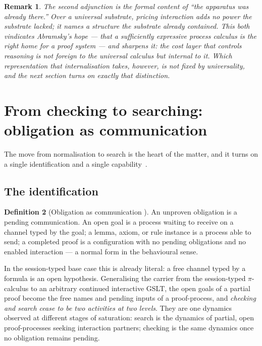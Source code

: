 \documentclass[11pt]{article}
\theoremstyle{definition}
\newtheorem{definition}{Definition}[section]
\theoremstyle{plain}
\newtheorem{remark}[definition]{Remark}
\begin{document}
\begin{remark}
The second adjunction is the formal content of ``the apparatus was already
there.'' Over a universal substrate, pricing interaction adds no power the
substrate lacked; it names a structure the substrate already contained. This
both vindicates Abramsky's hope --- that a sufficiently expressive process
calculus is the right home for a proof system --- and sharpens it: the cost
layer that controls reasoning is not foreign to the universal calculus but
internal to it. Which representation that internalisation takes, however, is not
fixed by universality, and the next section turns on exactly that distinction.
\end{remark}

\section{From checking to searching: obligation as communication}\label{sec:search}

The move from normalisation to search is the heart of the matter, and it turns
on a single identification and a single capability~\cite{NoteIV}.

\subsection{The identification}

\begin{definition}[Obligation as communication {\cite{NoteIV}}]
An unproven obligation is a pending communication. An open goal is a process
waiting to receive on a channel typed by the goal; a lemma, axiom, or rule
instance is a process able to send; a completed proof is a configuration with no
pending obligations and no enabled interaction --- a normal form in the
behavioural sense.
\end{definition}

In the session-typed base case this is already literal: a free channel typed by
a formula is an open hypothesis. Generalising the carrier from the session-typed
$\pi$-calculus to an arbitrary continued interactive GSLT, the open goals of a
partial proof become the free names and pending inputs of a proof-process, and
\emph{checking and search cease to be two activities at two levels}. They are
one dynamics observed at different stages of saturation: search is the dynamics
of partial, open proof-processes seeking interaction partners; checking is the
same dynamics once no obligation remains pending.
\end{document}
